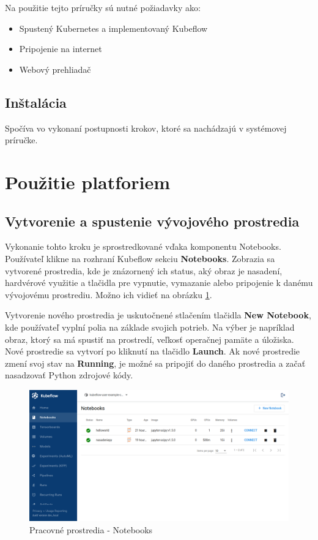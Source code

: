 Na použitie tejto príručky sú nutné požiadavky ako:

\begin{itemize}
    \item Spustený Kubernetes a implementovaný Kubeflow
    \item Pripojenie na internet
    \item Webový prehliadač
\end{itemize}

\subsection*{Inštalácia}

Spočíva vo vykonaní postupnosti krokov, ktoré sa nachádzajú v systémovej príručke.

\section{Použitie platforiem}

\subsection*{Vytvorenie a spustenie vývojového prostredia}

Vykonanie tohto kroku je sprostredkované vďaka komponentu Notebooks. Používateľ klikne na rozhraní Kubeflow sekciu \textbf{Notebooks}. Zobrazia sa vytvorené prostredia, kde je znázornený ich status, aký obraz je nasadení, hardvérové využitie a tlačidla pre vypnutie, vymazanie alebo pripojenie k danému vývojovému prostrediu. Možno ich vidieť na obrázku \ref{notebook}.

Vytvorenie nového prostredia je uskutočnené stlačením tlačidla \textbf{New Notebook}, kde používateľ vyplní polia na základe svojich potrieb. Na výber je napríklad obraz, ktorý sa má spustiť na prostredí, veľkosť operačnej pamäte a úložiska. Nové prostredie sa vytvorí po kliknutí na tlačidlo \textbf{Launch}. Ak nové prostredie zmení svoj stav na \textbf{Running}, je možné sa pripojiť do daného prostredia a začať nasadzovať Python zdrojové kódy.

\begin{figure}[!h]
    \centering
    \includegraphics[width=1\linewidth]{figures/1.png}
    \caption{Pracovné prostredia - Notebooks}
    \label{notebook}
\end{figure}

